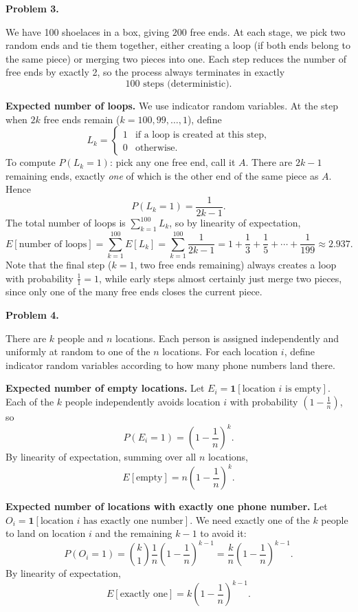 \documentclass{article}
\begin{document}
\bigskip
\textbf{Problem 3.}

We have 100 shoelaces in a box, giving $200$ free ends. At each stage, we pick
two random ends and tie them together, either creating a loop (if both ends
belong to the same piece) or merging two pieces into one. Each step reduces the
number of free ends by exactly 2, so the process always terminates in
exactly
\[
    \boxed{100 \text{ steps (deterministic).}}
\]

\textbf{Expected number of loops.} We use indicator random variables. At the
step when $2k$ free ends remain ($k = 100, 99, \ldots, 1$), define
\[
    L_k = \begin{cases} 1 & \text{if a loop is created at this step,} \\ 0 & \text{otherwise.} \end{cases}
\]
To compute $P(L_k = 1)$: pick any one free end, call it $A$. There are $2k-1$
remaining ends, exactly \emph{one} of which is the other end of the same piece
as $A$. Hence
\[
    P(L_k = 1) = \frac{1}{2k-1}.
\]
The total number of loops is $\sum_{k=1}^{100} L_k$, so by linearity of
expectation,
\[
    E[\text{number of loops}]
    = \sum_{k=1}^{100} E[L_k]
    = \sum_{k=1}^{100} \frac{1}{2k-1}
    = 1 + \frac{1}{3} + \frac{1}{5} + \cdots + \frac{1}{199}
    \approx 2.937.
\]
Note that the final step ($k=1$, two free ends remaining) always creates a
loop with probability $\tfrac{1}{1}=1$, while early steps almost certainly
just merge two pieces, since only one of the many free ends closes the current
piece.

\bigskip
\textbf{Problem 4.}

There are $k$ people and $n$ locations. Each person is assigned independently
and uniformly at random to one of the $n$ locations. For each location $i$,
define indicator random variables according to how many phone numbers land
there.

\bigskip
\textbf{Expected number of empty locations.}
Let $E_i = \mathbf{1}[\text{location } i \text{ is empty}]$. Each of the $k$
people independently avoids location $i$ with probability
$\left(1 - \tfrac{1}{n}\right)$, so
\[
    P(E_i = 1) = \left(1 - \frac{1}{n}\right)^k.
\]
By linearity of expectation, summing over all $n$ locations,
\[
    E[\text{empty}] = n\!\left(1 - \frac{1}{n}\right)^{\!k}.
\]

\bigskip
\textbf{Expected number of locations with exactly one phone number.}
Let $O_i = \mathbf{1}[\text{location } i \text{ has exactly one number}]$.
We need exactly one of the $k$ people to land on location $i$ and the
remaining $k-1$ to avoid it:
\[
    P(O_i = 1) = \binom{k}{1}\frac{1}{n}\left(1 - \frac{1}{n}\right)^{k-1}
               = \frac{k}{n}\left(1 - \frac{1}{n}\right)^{k-1}.
\]
By linearity of expectation,
\[
    E[\text{exactly one}] = k\!\left(1 - \frac{1}{n}\right)^{\!k-1}.
\]
\end{document}
